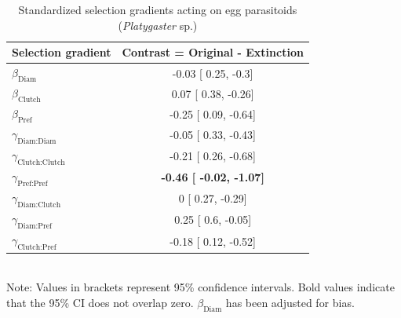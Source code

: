 \documentclass[11pt,]{article}
\begin{document}
\bigskip

\begin{table}[h]
\caption{Standardized selection gradients acting on egg parasitoids (\textit{Platygaster} sp.)}
\label{Table:ExtendedGradients}
\centering
\begin{tabular}{lc}
\\ 
\hline
\textbf{Selection gradient} & \textbf{Contrast = Original - Extinction}  \\ 
\hline
$\beta_{\text{Diam}}$ & 

-0.03 [
0.25,
-0.3] \\

$\beta_{\text{Clutch}}$ & 

0.07 [
0.38,
-0.26] \\

$\beta_{\text{Pref}}$ &

-0.25 [
0.09,
-0.64] \\

$\gamma_{\text{Diam:Diam}}$ &

-0.05 [
0.33,
-0.43] \\

$\gamma_{\text{Clutch:Clutch}}$ & 

-0.21 [
0.26,
-0.68] \\

$\gamma_{\text{Pref:Pref}}$ & 

\textbf{
-0.46 [
-0.02,
-1.07] }\\

$\gamma_{\text{Diam:Clutch}}$ & 

0 [
0.27,
-0.29] \\

$\gamma_{\text{Diam:Pref}}$ & 

0.25 [
0.6,
-0.05] \\

$\gamma_{\text{Clutch:Pref}}$ & 

-0.18 [
0.12,
-0.52] \\ 
\hline
\end{tabular}
\bigskip{}
\\
{\footnotesize Note: Values in brackets represent 95\% confidence intervals. Bold values indicate that the 95\% CI does not overlap zero. $\beta_{\text{Diam}}$ has been adjusted for bias.}
\end{table}
\end{document}
